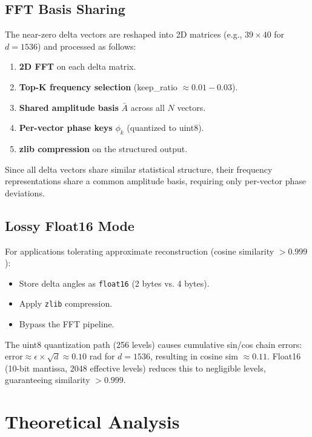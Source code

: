 \documentclass[11pt,a4paper]{article}
\begin{document}
\subsection{FFT Basis Sharing}
The near-zero delta vectors are reshaped into 2D matrices (e.g., $39 \times 40$ for $d=1536$) and processed as follows:
\begin{enumerate}
    \item \textbf{2D FFT} on each delta matrix.
    \item \textbf{Top-K frequency selection} (keep\_ratio $\approx 0.01 - 0.03$).
    \item \textbf{Shared amplitude basis} $\bar{A}$ across all $N$ vectors.
    \item \textbf{Per-vector phase keys} $\phi_k$ (quantized to uint8).
    \item \textbf{zlib compression} on the structured output.
\end{enumerate}
Since all delta vectors share similar statistical structure, their frequency representations share a common amplitude basis, requiring only per-vector phase deviations.

\subsection{Lossy Float16 Mode}
For applications tolerating approximate reconstruction (cosine similarity $>0.999$):
\begin{itemize}
    \item Store delta angles as \texttt{float16} (2 bytes vs. 4 bytes).
    \item Apply \texttt{zlib} compression.
    \item Bypass the FFT pipeline.
\end{itemize}
\begin{tcolorbox}[colback=red!5!white,colframe=red!75!black,title=Important Precision Note]
The uint8 quantization path (256 levels) causes cumulative sin/cos chain errors:
$\text{error} \approx \epsilon \times \sqrt{d} \approx 0.10$ rad for $d=1536$, resulting in cosine sim $\approx 0.11$.
Float16 (10-bit mantissa, 2048 effective levels) reduces this to negligible levels, guaranteeing similarity $>0.999$.
\end{tcolorbox}


\section{Theoretical Analysis}
\label{sec:theory}
\end{document}
